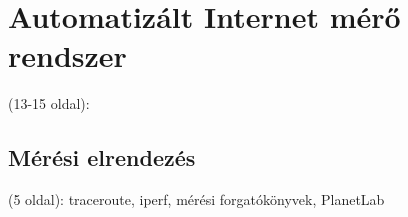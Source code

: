 \chapter{Automatizált Internet mérő rendszer}
(13-15 oldal): 


\section{Mérési elrendezés}
(5 oldal): traceroute, iperf, mérési forgatókönyvek, PlanetLab

